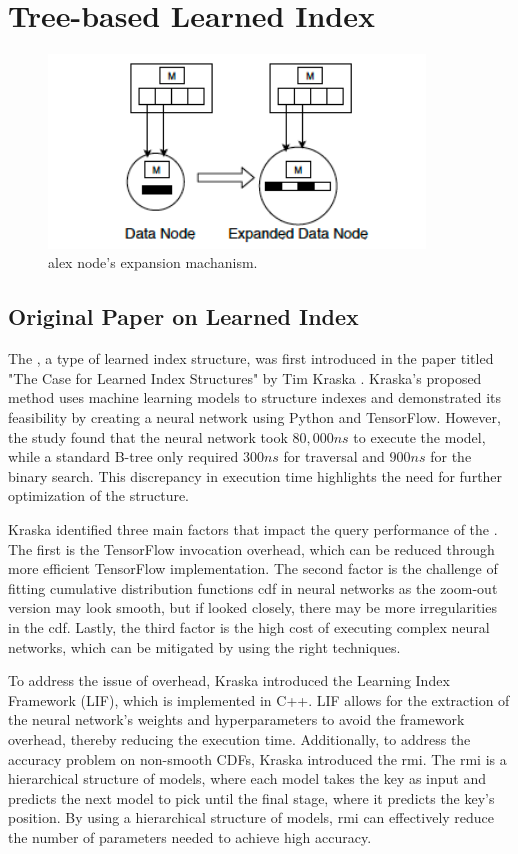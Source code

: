 \section{Tree-based Learned Index}
\begin{figure}
    \centering
    \includegraphics[width=100mm,scale=1]{Figures/alexNodeExpand.png}
    \caption{
     \acrlong{alex} node's expansion machanism.
    }
    \label{fig:alexNodeExpand}
\end{figure}
\subsection{Original Paper on Learned Index}
The \learnindex, a type of learned index structure, was first introduced in the paper titled "The Case for Learned Index Structures" by Tim Kraska \cite{CasedLearnedIndex}. Kraska's proposed method uses machine learning models to structure indexes and demonstrated its feasibility by creating a neural network using Python and TensorFlow. However, the study found that the neural network took $80,000ns$ to execute the model, while a standard B-tree only required $300ns$ for traversal and $900ns$ for the binary search. This discrepancy in execution time highlights the need for further optimization of the \learnindex structure.

Kraska identified three main factors that impact the query performance of the \learnindex. The first is the TensorFlow invocation overhead, which can be reduced through more efficient TensorFlow implementation. The second factor is the challenge of fitting cumulative distribution functions \acrfull{cdf} in neural networks as the \textsf{zoom-out} version may look smooth, but if looked closely, there may be more irregularities in the \acrshort{cdf}. Lastly, the third factor is the high cost of executing complex neural networks, which can be mitigated by using the right techniques.

To address the issue of overhead, Kraska introduced the Learning Index Framework (LIF), which is implemented in C++. LIF allows for the extraction of the neural network's weights and hyperparameters to avoid the framework overhead, thereby reducing the execution time. Additionally, to address the accuracy problem on non-smooth CDFs, Kraska introduced the \acrfull{rmi}. The \acrshort{rmi} is a hierarchical structure of models, where each model takes the key as input and predicts the next model to pick until the final stage, where it predicts the key's position. By using a hierarchical structure of models, \acrshort{rmi} can effectively reduce the number of parameters needed to achieve high accuracy.


